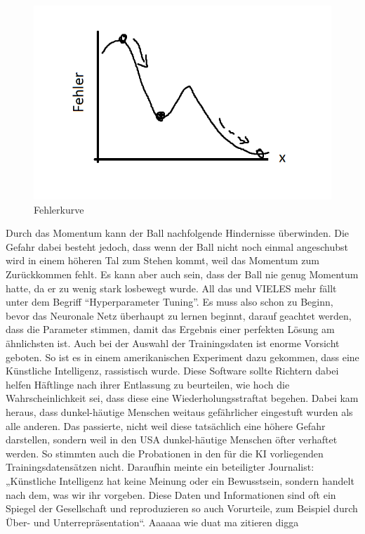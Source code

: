 \begin{figure}[H]
    \centering
    \includegraphics[scale=1]{pics/fehler.png}
    \caption{Fehlerkurve}
    \label{fig:tech:Fehler}
\end{figure}

Durch das Momentum kann der Ball nachfolgende Hindernisse überwinden. Die Gefahr dabei besteht jedoch, dass wenn der Ball nicht noch einmal angeschubst wird in einem höheren Tal zum Stehen kommt, weil das Momentum zum Zurückkommen fehlt. Es kann aber auch sein, dass der Ball nie genug Momentum hatte, da er zu wenig stark losbewegt wurde. All das und VIELES mehr fällt unter dem Begriff ``Hyperparameter Tuning''. Es muss also schon zu Beginn, bevor das Neuronale Netz überhaupt zu lernen beginnt, darauf geachtet werden, dass die Parameter stimmen, damit das Ergebnis einer perfekten Lösung am ähnlichsten ist.
Auch bei der Auswahl der Trainingsdaten ist enorme Vorsicht geboten. So ist es in einem amerikanischen Experiment dazu gekommen, dass eine Künstliche Intelligenz, rassistisch wurde. Diese Software sollte Richtern dabei helfen Häftlinge nach ihrer Entlassung zu beurteilen, wie hoch die Wahrscheinlichkeit sei, dass diese eine Wiederholungsstraftat begehen. Dabei kam heraus, dass dunkel-häutige Menschen weitaus gefährlicher eingestuft wurden als alle anderen. Das passierte, nicht weil diese tatsächlich eine höhere Gefahr darstellen, sondern weil in den USA dunkel-häutige Menschen öfter verhaftet werden. So stimmten auch die Probationen in den für die KI vorliegenden Trainingsdatensätzen nicht. Daraufhin meinte ein beteiligter Journalist: „Künstliche Intelligenz hat keine Meinung oder ein Bewusstsein, sondern handelt nach dem, was wir ihr vorgeben. Diese Daten und Informationen sind oft ein Spiegel der Gesellschaft und reproduzieren so auch Vorurteile, zum Beispiel durch Über- und Unterrepräsentation“.
Aaaaaa wie duat ma zitieren digga

